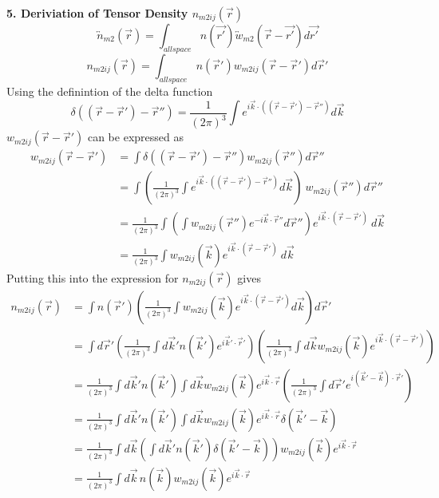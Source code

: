 \documentclass[double,12pt]{beavtex}
\begin{document}
\textbf{5. Deriviation of Tensor Density $n_{m2ij}(\vec{r})$}
\begin{equation}{\overleftrightarrow{n}_{m2}(\vec{r})=\int_{allspace}n(\vec{r'})\overleftrightarrow{w}_{m2}(\vec{r}-\vec{r'})d{\vec{r'}}}\end{equation} 
\begin{equation}{n_{m2ij}(\vec{r})=\int_{allspace}{n(\vec{r}')w_{m2ij}(\vec{r}-\vec{r}'){}d{\vec{r}'}}}\end{equation}
Using the definintion of the delta function
\begin{equation}{\delta}((\vec{r}-\vec{r}')-\vec{r}'')={ \frac{1}{\left(2\pi\right)^3}\int e^{i\vec k\cdot ((\vec r-\vec r')-\vec{r}'')}d\vec{k}}\end{equation} 
$w_{m2ij}(\vec{r}-\vec{r}')$ can be expressed as
\begin{align}
    w_{m2ij}(\vec{r}-\vec{r}') &= \int{\delta((\vec{r}-\vec{r}')-\vec{r}'')w_{m2ij}(\vec{r}''){}d{\vec{r}''}} \\
    &= \int{\left(\frac{1}{\left(2\pi\right)^3}\int e^{i\vec k\cdot((\vec r-\vec r')-\vec{r}'')}d\vec{k}\right){~}w_{m2ij}(\vec{r}''){}d{\vec{r}''}} \\
    &= \frac{1}{\left(2\pi\right)^3}\int{\left(\int w_{m2ij}(\vec{r}'')e^{-i\vec k\cdot\vec{r}''}d\vec{r}''\right)e^{i\vec k\cdot(\vec r-\vec r')}{~}{}d{\vec{k}}} \\
    &= \frac{1}{\left(2\pi\right)^3}\int{w_{m2ij}(\vec k)e^{i\vec k\cdot(\vec r-\vec r')}{~}{}d{\vec{k}}} 
  \end{align} 
Putting this into the expression for $n_{m2ij}(\vec{r})$ gives 
\begin{align}
    n_{m2ij}(\vec r) &= \int n(\vec r') \left(\frac{1}{\left(2\pi\right)^3}\int w_{m2ij}(\vec k)e^{i\vec k\cdot (\vec r-\vec r')}d\vec{k}\right)d\vec r' \\
    &= \int d\vec r' \left(\frac{1}{\left(2\pi\right)^3}\int d\vec k' n(\vec k')e^{i\vec k'\cdot \vec r'}\right) \left(\frac{1}{\left(2\pi\right)^3}\int d\vec k w_{m2ij}(\vec k)e^{i\vec k\cdot (\vec r-\vec r')}\right) \\
    &=  \frac{1}{\left(2\pi\right)^3}\int d\vec k' n(\vec k') \int d\vec k w_{m2ij}(\vec k)
    e^{i\vec k\cdot \vec r}\left(\frac{1}{\left(2\pi\right)^3}\int d\vec r'e^{i(\vec k'-\vec k)\cdot \vec r'}\right)
    \\
   &= \frac{1}{\left(2\pi\right)^3}\int d\vec k' n(\vec k') \int d\vec k w_{m2ij}(\vec k)e^{i\vec k\cdot \vec r}\delta(\vec k'-\vec k) \\
    &= \frac{1}{\left(2\pi\right)^3}\int d\vec k \left(\int d\vec k' n(\vec k')\delta(\vec k'-\vec k)\right) w_{m2ij}(\vec k)e^{i\vec k\cdot \vec r}
    \\
    &= \frac{1}{\left(2\pi\right)^3}\int d\vec k\, n(\vec k) w_{m2ij}(\vec k)e^{i\vec k\cdot \vec r}
  \end{align} 
\[{}\]
\[{}\]
\end{document}
